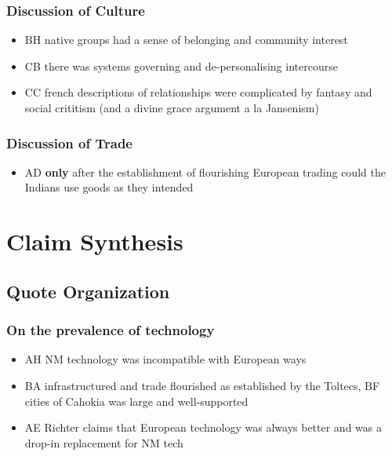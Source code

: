 \documentclass[letterpaper]{article}
\begin{document}
\subsubsection{Discussion of Culture}
\label{sec:org0c8f0b2}
\begin{itemize}
\item BH native groups had a sense of belonging and community interest
\item CB there was systems governing and de-personalising intercourse
\item CC french descriptions of relationships were complicated by fantasy and social crititism (and a divine grace argument a la Jansenism)
\end{itemize}

\subsubsection{Discussion of Trade}
\label{sec:orgeb10473}
\begin{itemize}
\item AD \textbf{only} after the establishment of flourishing European trading could the Indians use goods as they intended
\end{itemize}

\section{Claim Synthesis}
\label{sec:org273ead6}

\subsection{Quote Organization}
\label{sec:orgc894b8d}

\subsubsection{On the prevalence of technology}
\label{sec:org422f9d5}
\begin{itemize}
\item AH NM technology was incompatible with European ways
\item BA infrastructured and trade flourished as established by the Toltecs, BF cities of Cahokia was large and well-supported
\item AE Richter claims that European technology was always better and was a drop-in replacement for NM tech
\end{itemize}
\end{document}
